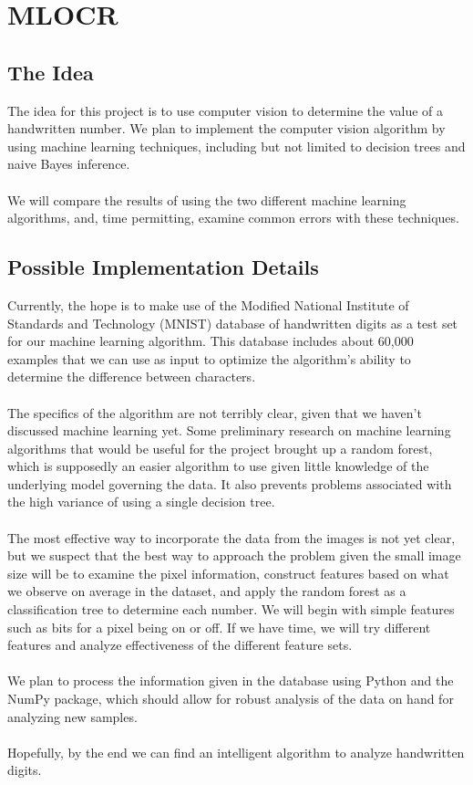 \documentclass{article}
\begin{document}
	 \section*{MLOCR}
	\label*{Optical Character Recognition using Machine Learning}
	   \subsection*{The Idea}
     The idea for this project is to use computer vision to determine the value of a handwritten number. We plan to implement the computer vision algorithm by using machine learning techniques, including but not limited to decision trees and naive Bayes inference. \\\\
     We will compare the results of using the two different machine learning algorithms, and, time permitting, examine common errors with these techniques.
     \subsection*{Possible Implementation Details}
     Currently, the hope is to make use of the Modified National Institute of Standards and Technology (MNIST) database of handwritten digits as a test set for our machine learning algorithm. This database includes about 60,000 examples that we can use as input to optimize the algorithm's ability to determine the difference between characters. \\\\
     The specifics of the algorithm are not terribly clear, given that we haven't discussed machine learning yet. Some preliminary research on machine learning algorithms that would be useful for the project brought up a random forest, which is supposedly an easier algorithm to use given little knowledge of the underlying model governing the data. It also prevents problems associated with the high variance of using a single decision tree. \\\\
     The most effective way to incorporate the data from the images is not yet clear, but we suspect that the best way to approach the problem given the small image size will be to examine the pixel information, construct features based on what we observe on average in the dataset, and apply the random forest as a classification tree to determine each number. We will begin with simple features such as bits for a pixel being on or off. If we have time, we will try different features and analyze effectiveness of the different feature sets.\\\\
     We plan to process the information given in the database using Python and the NumPy package, which should allow for robust analysis of the data on hand for analyzing new samples. \\\\
     Hopefully, by the end we can find an intelligent algorithm to analyze handwritten digits.
    
\end{document}

